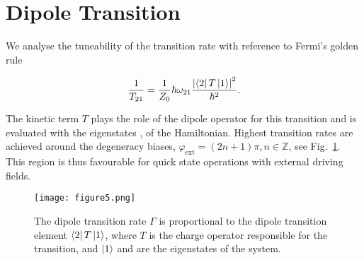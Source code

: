 \section{Dipole Transition}
\label{sec:dipole-transition}

We analyse  the tuneability  of the   \ra  {} transition  rate with
reference to Fermi's golden rule %

 \begin{equation}\label{eqn:goldenRule}
   \frac{1}{T_{21}} = \frac{1}{Z_0}\hbar\omega_{21}\frac{\left|\bra{2}T\Ket{1}\right|^2}{\hbar^2}.
 \end{equation}

 \noindent The kinetic term $ T $ plays  the role of the dipole operator for this
 transition  and is  evaluated with  the  eigenstates ,   of  the
 Hamiltonian.   Highest  transition  rates  are achieved  around  the  degeneracy
 biases,     $    \varphi_{\text{ext}}     =    (2n+1)\pi,     n\in\mathbb{Z}    $,     see
 Fig.~\ref{fig:dipole_transition}. This region is thus favourable for quick state
 operations with external driving fields.
 
 \begin{figure}
   \centering \texttt{[image: figure5.png]}
 	\caption{The dipole transition rate $ \Gamma $ is proportional to the dipole transition element $ \bra{2}T\ket{1} $, where $ T $ is the charge operator responsible for the transition, and $ \Ket{1} $ and  are the eigenstates of the system. %
          \label{fig:dipole_transition}}
      \end{figure}

